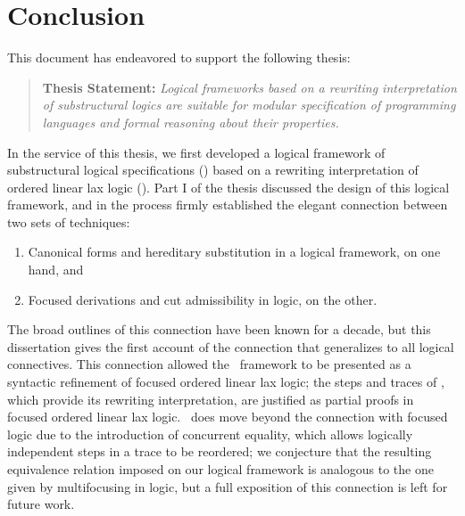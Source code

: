 \chapter{Conclusion}
\label{chapter-conclusion}

This document has endeavored to support the following thesis:
\smallskip
\begin{quote} {\bf Thesis Statement:} {\it Logical frameworks based on
    a rewriting interpretation of substructural logics are suitable
    for modular specification of programming languages and formal
    reasoning about their properties.}
\end{quote}
\bigskip


In the service of this thesis, we first developed a logical framework
of substructural logical specifications (\sls) based on a rewriting
interpretation of ordered linear lax logic (\ollll). Part I of the
thesis discussed the design of this logical framework, and in the
process firmly established the elegant connection between two sets of
techniques:

\smallskip
\begin{enumerate}
\item Canonical forms and hereditary
substitution in a logical framework, on one hand, and 
\item Focused derivations and cut
admissibility in logic, on the other.
\end{enumerate}

\smallskip
\noindent 
The broad outlines of this connection have been known for a decade,
but this dissertation gives the first account of the connection that
generalizes to all logical connectives. This connection allowed the
\sls~framework to be presented as a syntactic refinement of focused
ordered linear lax logic; the steps and traces of \sls, which provide
its rewriting interpretation, are justified as partial proofs in
focused ordered linear lax logic. \sls~does move beyond the connection
with focused logic due to the introduction of concurrent equality,
which allows logically independent steps in a trace to be reordered;
we conjecture that the resulting equivalence relation imposed on our
logical framework is analogous to the one given by multifocusing in
logic, but a full exposition of this connection is left for future
work.

